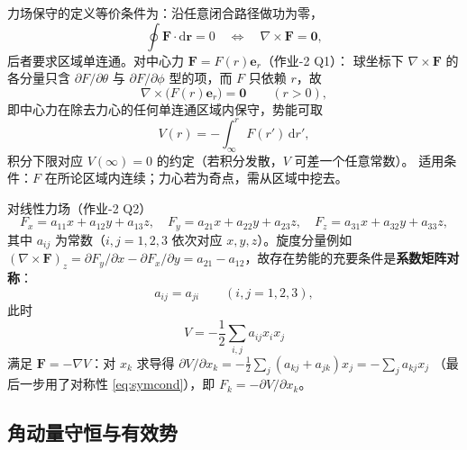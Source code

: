 \documentclass[UTF8,a4paper,11pt]{ctexart}
\begin{document}
力场保守的定义等价条件为：沿任意闭合路径做功为零，
\begin{equation}
  \oint \boldsymbol{F}\cdot\mathrm{d}\boldsymbol{r}=0
  \quad\Longleftrightarrow\quad
  \nabla\times\boldsymbol{F}=\boldsymbol{0},
  \label{eq:conservative}
\end{equation}
后者要求区域单连通。对中心力 $\boldsymbol{F}=F(r)\boldsymbol{e}_r$（作业-2 Q1）：
球坐标下 $\nabla\times\boldsymbol{F}$ 的各分量只含
$\partial F/\partial\theta$ 与 $\partial F/\partial\phi$ 型的项，而 $F$ 只依赖 $r$，故
\begin{equation}
  \nabla\times\bigl(F(r)\boldsymbol{e}_r\bigr)=\boldsymbol{0}
  \qquad (r>0),
  \label{eq:centralcurl}
\end{equation}
即中心力在除去力心的任何单连通区域内保守，势能可取
\begin{equation}
  V(r)=-\int_{\infty}^{r}F(r')\,\mathrm{d}r',
  \label{eq:centralV}
\end{equation}
积分下限对应 $V(\infty)=0$ 的约定（若积分发散，$V$ 可差一个任意常数）。
适用条件：$F$ 在所论区域内连续；力心若为奇点，需从区域中挖去。

对线性力场（作业-2 Q2）
\begin{equation}
  F_x=a_{11}x+a_{12}y+a_{13}z,\quad
  F_y=a_{21}x+a_{22}y+a_{23}z,\quad
  F_z=a_{31}x+a_{32}y+a_{33}z,
  \label{eq:linearforce}
\end{equation}
其中 $a_{ij}$ 为常数（$i,j=1,2,3$ 依次对应 $x,y,z$）。旋度分量例如
$(\nabla\times\boldsymbol{F})_z=\partial F_y/\partial x-\partial F_x/\partial y
=a_{21}-a_{12}$，故存在势能的充要条件是\textbf{系数矩阵对称}：
\begin{equation}
  a_{ij}=a_{ji}\qquad (i,j=1,2,3),
  \label{eq:symcond}
\end{equation}
此时
\begin{equation}
  V=-\frac12\sum_{i,j}a_{ij}x_ix_j
  \label{eq:linearV}
\end{equation}
满足 $\boldsymbol{F}=-\nabla V$：对 $x_k$ 求导得
$\partial V/\partial x_k=-\frac12\sum_j(a_{kj}+a_{jk})x_j=-\sum_j a_{kj}x_j$
（最后一步用了对称性 \eqref{eq:symcond}），即 $F_k=-\partial V/\partial x_k$。

\subsection{角动量守恒与有效势}
\label{sub:veff}
\end{document}
